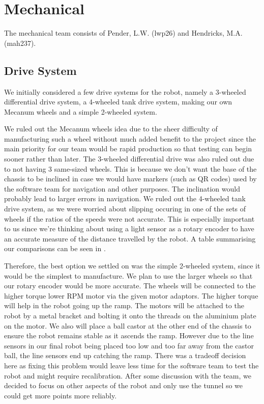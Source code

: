 \documentclass{article}
\begin{document}
\hspace{10em}

\section{Mechanical}
\quad The mechanical team consists of Pender, L.W. (lwp26) and Hendricks, M.A. (mah237). 

\subsection{Drive System}
\quad \quad We initially considered a few drive systems for the robot, namely a 3-wheeled differential drive system, a 4-wheeled tank drive system, making our own Mecanum wheels and a simple 2-wheeled system. 

\quad We ruled out the Mecanum wheels idea due to the sheer difficulty of manufacturing such a wheel without much added benefit to the project since the main priority for our team would be rapid production so that testing can begin sooner rather than later. The 3-wheeled differential drive was also ruled out due to not having 3 same-sized wheels. This is because we don't want the base of the chassis to be inclined in case we would have markers (such as QR codes) used by the software team for navigation and other purposes. The inclination would probably lead to larger errors in navigation. We ruled out the 4-wheeled tank drive system, as we were worried about slipping occuring in one of the sets of wheels if the ratios of the speeds were not accurate. This is especially important to us since we're thinking about using a light sensor as a rotary encoder to have an accurate measure of the distance travelled by the robot. A table summarising our comparisons can be seen in .

\quad Therefore, the best option we settled on was the simple 2-wheeled system, since it would be the simplest to manufacture. We plan to use the larger wheels so that our rotary encoder would be more accurate. The wheels will be connected to the higher torque lower RPM motor via the given motor adaptors. The higher torque will help in the robot going up the ramp. The motors will be attached to the robot by a metal bracket and bolting it onto the threads on the aluminium plate on the motor. We also will place a ball castor at the other end of the chassis to ensure the robot remains stable as it ascends the ramp. However due to the line sensors in our final robot being placed too low and too far away from the castor ball, the line sensors end up catching the ramp. There was a tradeoff decision here as fixing this problem would leave less time for the software team to test the robot and might require recalibration. After some discussion with the team, we decided to focus on other aspects of the robot and only use the tunnel so we could get more points more reliably.
\end{document}

